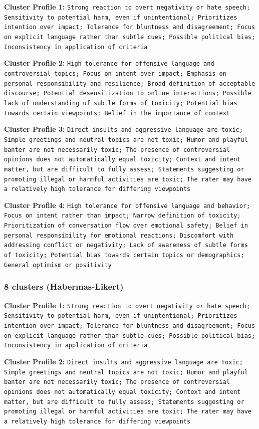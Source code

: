 \documentclass[11pt]{article}
\begin{document}
\textbf{Cluster Profile 1:} \texttt{Strong reaction to overt negativity or hate speech; Sensitivity to potential harm, even if unintentional; Prioritizes intention over impact; Tolerance for bluntness and disagreement; Focus on explicit language rather than subtle cues; Possible political bias; Inconsistency in application of criteria}


\textbf{Cluster Profile 2:} \texttt{High tolerance for offensive language and controversial topics; Focus on intent over impact; Emphasis on personal responsibility and resilience; Broad definition of acceptable discourse; Potential desensitization to online interactions; Possible lack of understanding of subtle forms of toxicity; Potential bias towards certain viewpoints; Belief in the importance of context}


\textbf{Cluster Profile 3:} \texttt{Direct insults and aggressive language are toxic; Simple greetings and neutral topics are not toxic; Humor and playful banter are not necessarily toxic; The presence of controversial opinions does not automatically equal toxicity; Context and intent matter, but are difficult to fully assess; Statements suggesting or promoting illegal or harmful activities are toxic; The rater may have a relatively high tolerance for differing viewpoints}


\textbf{Cluster Profile 4:} \texttt{High tolerance for offensive language and behavior; Focus on intent rather than impact; Narrow definition of toxicity; Prioritization of conversation flow over emotional safety; Belief in personal responsibility for emotional reactions; Discomfort with addressing conflict or negativity; Lack of awareness of subtle forms of toxicity; Potential bias towards certain topics or demographics; General optimism or positivity}


\subsubsection{8 clusters (Habermas-Likert)}


\textbf{Cluster Profile 1:} \texttt{Strong reaction to overt negativity or hate speech; Sensitivity to potential harm, even if unintentional; Prioritizes intention over impact; Tolerance for bluntness and disagreement; Focus on explicit language rather than subtle cues; Possible political bias; Inconsistency in application of criteria}


\textbf{Cluster Profile 2:} \texttt{Direct insults and aggressive language are toxic; Simple greetings and neutral topics are not toxic; Humor and playful banter are not necessarily toxic; The presence of controversial opinions does not automatically equal toxicity; Context and intent matter, but are difficult to fully assess; Statements suggesting or promoting illegal or harmful activities are toxic; The rater may have a relatively high tolerance for differing viewpoints}
\end{document}
